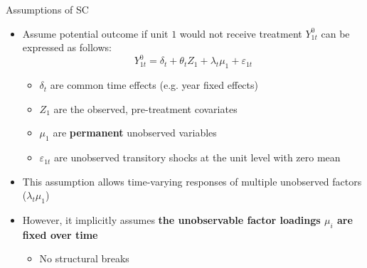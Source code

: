 \documentclass[hyperref={pdfpagelabels=false}]{beamer}
\begin{document}
%		




\begin{frame}{Assumptions of SC}
	\begin{itemize}
		\item Assume potential outcome if unit $1$ would not receive treatment $Y^0_{1t}$ can be expressed as follows:
		\begin{equation*}
			Y^0_{1t}=\delta_t+\theta_tZ_1+\lambda_t\mu_1+\varepsilon_{1t}
\end{equation*}
		\begin{itemize}
			\item $\delta_t$ are common time effects (e.g. year fixed effects)
			\vspace{0.2cm}
			\item $Z_1$ are the observed, pre-treatment covariates
			\vspace{0.2cm}
			\item $\mu_1$ are \textbf{permanent} unobserved variables
			\vspace{0.2cm}
			\item $\varepsilon_{1t}$ are unobserved transitory shocks at the unit level with zero mean
			\vspace{0.2cm}
		\end{itemize}
		\item This assumption allows time-varying responses of multiple unobserved factors ($\lambda_t\mu_1$) 
		
		\vspace{0.2cm}
		\item However, it implicitly assumes \textbf{the unobservable factor loadings $\mu_i$ are fixed over time} 
		\vspace{0.2cm}
		\begin{itemize}
			\item No structural breaks
		\end{itemize}
		
		
	\end{itemize}
\end{frame}
\end{document}
